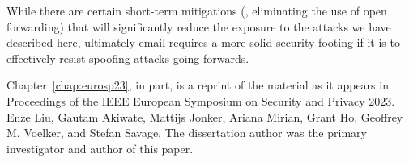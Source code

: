 While there are certain short-term mitigations (\eg, eliminating the use of
open forwarding) that will significantly reduce the exposure to the
attacks we have described here, ultimately email requires a more
solid security footing if it is to effectively resist spoofing
attacks going forwards.


Chapter~\ref{chap:eurosp23}, in part, is a reprint of the material as it appears in Proceedings of the IEEE European Symposium on Security and Privacy 2023. Enze Liu, Gautam Akiwate, Mattijs Jonker, Ariana Mirian, Grant Ho, Geoffrey M. Voelker, and Stefan Savage. The dissertation author was the primary investigator and author of this paper.






